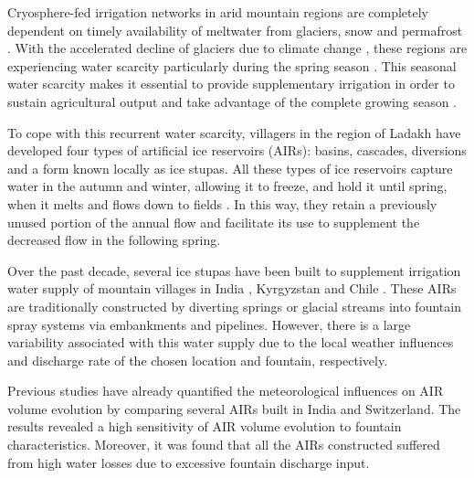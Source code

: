 \documentclass[tc, manuscript]{copernicus}
\begin{document}
\introduction

Cryosphere-fed irrigation networks in arid mountain regions are completely dependent on timely availability of
meltwater from glaciers, snow and permafrost \citep{farhanHydrologicalRegimesConjunction2015}. With the
accelerated decline of glaciers due to climate change \citep{nusserLocalKnowledgeGlobal2016}, these regions are
experiencing water scarcity particularly during the spring season \citep{norphelSnowWaterHarvesting2015}. This
seasonal water scarcity makes it essential to provide supplementary irrigation in order to sustain agricultural
output and take advantage of the complete growing season \citep{nusserLocalKnowledgeGlobal2016,
vincentEnergyClimateChange2009}.

To cope with this recurrent water scarcity, villagers in the region of Ladakh have developed four types of
artificial ice reservoirs (AIRs): basins, cascades, diversions and a form known locally as ice stupas. All these
types of ice reservoirs capture water in the autumn and winter, allowing it to freeze, and hold it until spring,
when it melts and flows down to fields \citep{vinceGlacierMan2009, clouseLadakhArtificialGlaciers2017,
nusserSociohydrologyArtificialGlaciers2019, ipccChapterHighMountain2019}. In this way, they retain a previously
unused portion of the annual flow and facilitate its use to supplement the decreased flow in the following
spring. 

Over the past decade, several ice stupas have been built to supplement irrigation water supply of mountain
villages in India \citep{wangchukIceStupaCompetition2020, palmerStoringFrozenWater2022,
aggarwalAdaptationClimateChange2021}, Kyrgyzstan \citep{bbcnewsBrightArtificialGlacier2020} and Chile
\citep{reutersConservationistsChileAim2021}. These AIRs are traditionally constructed by diverting springs or
glacial streams into fountain spray systems via embankments and pipelines. However, there is a large variability
associated with this water supply due to the local weather influences and discharge rate of the chosen location
and fountain, respectively. 

Previous studies \citep{balasubramanianInfluenceMeteorologicalConditions2022,
oerlemansBriefCommunicationGrowth2021} have already quantified the meteorological influences on AIR volume
evolution by comparing several AIRs built in India and Switzerland. The results revealed a high sensitivity of
AIR volume evolution to fountain characteristics. Moreover, it was found that all the AIRs constructed
suffered from high water losses due to excessive fountain discharge input. 
\end{document}
